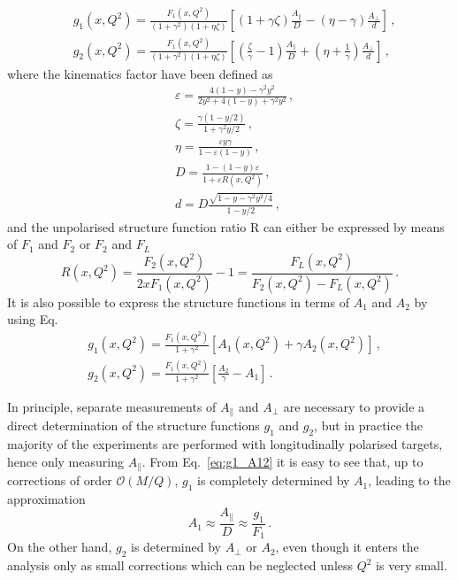 \begin{align}
  & g_1(x,Q^2) = \frac{F_1(x,Q^2)}{(1+\gamma^2)(1 + \eta \zeta)} \left[ (1 + \gamma \zeta) \frac{A_{\parallel}}{D} - (\eta - \gamma) \frac{A_{\perp}}{d} \right] \,, \\
  & g_2(x,Q^2) = \frac{F_1 (x, Q^2)}{(1 + \gamma^2)(1 + \eta \zeta)} \left[ \left( \frac{\zeta}{\gamma} - 1 \right) \frac{A_{\parallel}}{D} + (\eta + \frac{1}{\gamma}) \frac{A_{\perp}}{d} \right] \,,
\end{align}
where the kinematics factor have been defined as 
\begin{align}
  & \varepsilon = \frac{4(1-y) - \gamma^2 y^2}{2 y^2 + 4(1-y) + \gamma^2 y^2} \,,\\
  & \zeta = \frac{\gamma(1 - y/2)}{1 + \gamma^2y/2} \,,\\
  & \eta = \frac{\varepsilon y \gamma}{1 - \varepsilon(1 - y)} \,,\\
  & D = \frac{1 - (1 - y)\varepsilon }{1 + \varepsilon R (x,Q^2)} \,,\\
  & d = D \frac{\sqrt{1 - y - \gamma^2 y^2 /4}}{1 - y/2}\,,
\end{align}
and the unpolarised structure function ratio R can either be expressed by means of $F_1$ and $F_2$ or $F_2$ and $F_{L}$
\begin{equation}
  R(x, Q^2) = \frac{F_2(x,Q^2)}{2 x F_1 (x, Q^2)} - 1 = \frac{F_{L}(x,Q^2)}{F_2 (x,Q^2) - F_{L}(x,Q^2)}\,.
\end{equation}
It is also possible to express the structure functions in terms of $A_1$ and $A_2$ by using Eq.
\begin{align}
  & g_1(x,Q^2) = \frac{F_1 (x,Q^2)}{1 + \gamma^2} \left[ A_1(x,Q^2) + \gamma A_2 (x,Q^2) \right] \,,
  \label{eq:g1_A12}\\
  & g_2(x,Q^2) = \frac{F_1 (x,Q^2)}{1 + \gamma^2} \left[ \frac{A_2}{\gamma} - A_1 \right] \,.
\end{align}
\par
In principle, separate measurements of $A_{\parallel}$ and $A_{\perp}$ are necessary to provide a direct determination of the structure functions $g_1$ and $g_2$, but in practice the majority of the experiments are performed with longitudinally polarised targets, hence only measuring $A_{\parallel}$. From Eq.~\eqref{eq:g1_A12} it is easy to see that, up to corrections of order $\mathcal{O}(M/Q)$, $g_1$ is completely determined by $A_1$, leading to the approximation
\begin{equation}
  A_1 \approx \frac{A_{\parallel}}{D} \approx \frac{g_1}{F_1}\,.
  \label{eq:A1}
\end{equation}
On the other hand, $g_2$ is determined by $A_{\perp}$ or $A_2$, even though it enters the analysis only as small corrections which can be neglected unless $Q^2$ is very small. 


